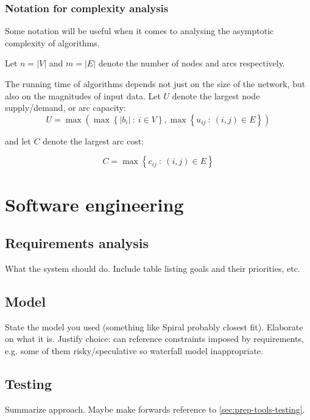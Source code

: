 \subsubsection{Notation for complexity analysis} \label{sec:prep-flow-complexity}

Some notation will be useful when it comes to analysing the asymptotic complexity
of algorithms. 

Let $n=|V|$ and $m=|E|$ denote the number of nodes and arcs respectively.

The running time of algorithms depends not just on the size of the
network, but also on the magnitudes of input data. Let $U$ denote
the largest node supply/demand, or arc capacity:
\begin{equation}
U=\max\left(\max\left\{ |b_{i}|\::\: i\in V\right\} ,\max\left\{ u_{ij}\::\:\left(i,j\right)\in E\right\} \right)
\end{equation}

and let $C$ denote the largest arc cost:

\begin{equation}
C=\max\left\{ c_{ij}\::\:(i,j)\in E\right\} 
\end{equation}

\section{Software engineering} \label{sec:prep-sweng}

\subsection{Requirements analysis} \label{sec:prep-sweng-requirements}
What the system should do. Include table listing goals and their priorities, etc.

\subsection{Model}
State the model you used (something like Spiral probably closest fit). Elaborate on what it is. Justify choice: can reference constraints imposed by requirements, e.g. some of them risky/speculative so waterfall model inappropriate.

\subsection{Testing}
Summarize approach. Maybe make forwards reference to \ref{sec:prep-tools-testing}.


